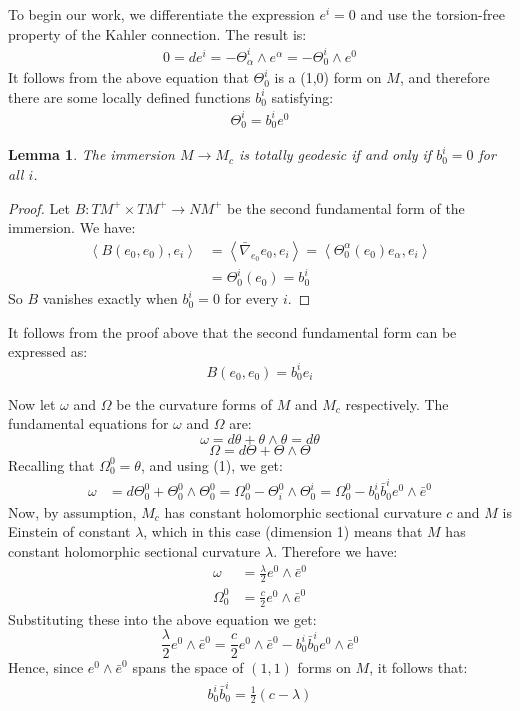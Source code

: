 \documentclass[11pt]{amsart}
\newtheorem{lem}[subsection]{Lemma}
\theoremstyle{definition}
\def \la { \left\langle }
\def \ra { \right\rangle }
\def \nablabar{ \bar{\nabla} }
\def \TMp{ TM^{+} }
\def \NMp{ NM^+ }
\begin{document}
To begin our work, we differentiate the expression $e^i = 0$ and use the torsion-free property of the Kahler connection.  The result is:
%
\begin{align*}
0 = d e^i = - \Theta^i_{\alpha} \wedge e^{\alpha} = - \Theta^i_0 \wedge e^0
\end{align*}
%
It follows from the above equation that $\Theta^i_0$ is a (1,0) form on $M$, and therefore there are some locally defined functions $b^i_0$ satisfying:
%
\begin{align}
\Theta^i_0 = b^i_0 e^0
\end{align}

\begin{lem} The immersion $M \rightarrow M_c$ is totally geodesic if and only if $b^i_0 = 0$ for all $i$.
\end{lem}

\begin{proof} Let $B : \TMp \times \TMp \rightarrow \NMp$ be the second fundamental form of the immersion.  We have:
%
\begin{align*}
\la B(e_0, e_0), e_i \ra &= \la \nablabar_{e_0} e_0, e_i \ra = \la \Theta^{\alpha}_0 ( e_0 ) e_{\alpha}, e_i \ra \\
&= \Theta^i_0 (e_0) = b^i_0
\end{align*}
%
So $B$ vanishes exactly when $b^i_0 = 0$ for every $i$.
%
\end{proof}

It follows from the proof above that the second fundamental form can be expressed as:
%
$$B(e_0, e_0) = b^i_0 e_i$$

Now let $\omega$ and $\Omega$ be the curvature forms of $M$ and $M_c$ respectively.  The fundamental equations for $\omega$ and $\Omega$ are:
%
$$\omega =  d\theta + \theta \wedge \theta = d\theta$$
%
$$\Omega = d\Theta + \Theta \wedge \Theta$$
%
Recalling that $\Omega^0_0 = \theta$, and using (1), we get:
%
\begin{align*}
\omega &= d\Theta^0_0 + \Theta^0_0 \wedge \Theta^0_0 = \Omega^0_0 - \Theta^0_i \wedge \Theta^i_0 = \Omega^0_0 - b^i_0 \bar{b}^i_0 e^0 \wedge \bar{e}^0
\end{align*}
%
Now, by assumption, $M_c$ has constant holomorphic sectional curvature $c$ and $M$ is Einstein of constant $\lambda$, which in this case (dimension 1) means that $M$ has constant holomorphic sectional curvature $\lambda$.  Therefore we have:
%
\begin{align*}
\omega &= \frac{\lambda}{2}e^0 \wedge \bar{e}^0 \\
\Omega^0_0 &= \frac{c}{2} e^0 \wedge \bar{e}^0
\end{align*}
%
Substituting these into the above equation we get:
%
$$\frac{\lambda}{2}e^0 \wedge \bar{e}^0 = \frac{c}{2} e^0 \wedge \bar{e}^0- b^i_0 \bar{b}^i_0 e^0 \wedge \bar{e}^0$$
%
Hence, since $e^0 \wedge \bar{e}^0$ spans the space of $(1,1)$ forms on $M$,  it follows that:
%
\begin{align}
b^i_0 \bar{b}^i_0 = \frac{1}{2}(c - \lambda)
\end{align}
\end{document}
